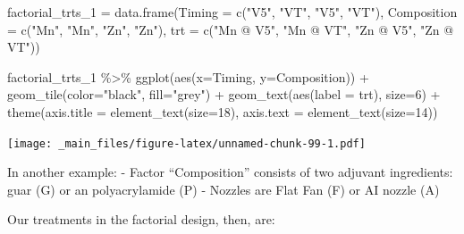 \documentclass[
]{book}
\newenvironment{Shaded}{\begin{snugshade}}{\end{snugshade}}
\newcommand{\AttributeTok}[1]{\textcolor[rgb]{0.77,0.63,0.00}{#1}}
\newcommand{\DecValTok}[1]{\textcolor[rgb]{0.00,0.00,0.81}{#1}}
\newcommand{\FunctionTok}[1]{\textcolor[rgb]{0.00,0.00,0.00}{#1}}
\newcommand{\NormalTok}[1]{#1}
\newcommand{\OtherTok}[1]{\textcolor[rgb]{0.56,0.35,0.01}{#1}}
\newcommand{\SpecialCharTok}[1]{\textcolor[rgb]{0.00,0.00,0.00}{#1}}
\newcommand{\StringTok}[1]{\textcolor[rgb]{0.31,0.60,0.02}{#1}}
\begin{document}
\begin{Shaded}
\begin{Highlighting}[]
\NormalTok{factorial\_trts\_1 }\OtherTok{=} \FunctionTok{data.frame}\NormalTok{(}\AttributeTok{Timing =} \FunctionTok{c}\NormalTok{(}\StringTok{"V5"}\NormalTok{, }\StringTok{"VT"}\NormalTok{, }\StringTok{"V5"}\NormalTok{, }\StringTok{"VT"}\NormalTok{),}
                              \AttributeTok{Composition =} \FunctionTok{c}\NormalTok{(}\StringTok{"Mn"}\NormalTok{, }\StringTok{"Mn"}\NormalTok{, }\StringTok{"Zn"}\NormalTok{, }\StringTok{"Zn"}\NormalTok{),}
                              \AttributeTok{trt =} \FunctionTok{c}\NormalTok{(}\StringTok{"Mn @ V5"}\NormalTok{,  }\StringTok{"Mn @ VT"}\NormalTok{, }\StringTok{"Zn @ V5"}\NormalTok{, }\StringTok{"Zn @ VT"}\NormalTok{))}

\NormalTok{factorial\_trts\_1 }\SpecialCharTok{\%\textgreater{}\%}
  \FunctionTok{ggplot}\NormalTok{(}\FunctionTok{aes}\NormalTok{(}\AttributeTok{x=}\NormalTok{Timing, }\AttributeTok{y=}\NormalTok{Composition)) }\SpecialCharTok{+}
  \FunctionTok{geom\_tile}\NormalTok{(}\AttributeTok{color=}\StringTok{"black"}\NormalTok{, }\AttributeTok{fill=}\StringTok{"grey"}\NormalTok{) }\SpecialCharTok{+}
  \FunctionTok{geom\_text}\NormalTok{(}\FunctionTok{aes}\NormalTok{(}\AttributeTok{label =}\NormalTok{ trt), }\AttributeTok{size=}\DecValTok{6}\NormalTok{) }\SpecialCharTok{+}
  \FunctionTok{theme}\NormalTok{(}\AttributeTok{axis.title =} \FunctionTok{element\_text}\NormalTok{(}\AttributeTok{size=}\DecValTok{18}\NormalTok{),}
        \AttributeTok{axis.text =} \FunctionTok{element\_text}\NormalTok{(}\AttributeTok{size=}\DecValTok{14}\NormalTok{))}
\end{Highlighting}
\end{Shaded}

\texttt{[image: \_main\_files/figure-latex/unnamed-chunk-99-1.pdf]}

In another example:
- Factor ``Composition'' consists of two adjuvant ingredients: guar (G) or an polyacrylamide (P)
- Nozzles are Flat Fan (F) or AI nozzle (A)

Our treatments in the factorial design, then, are:
\end{document}
